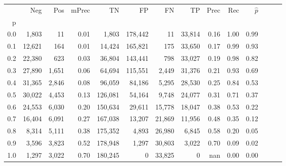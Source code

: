 \begin{tabular}{rrrrrrrrrrrrrr}
\toprule
{} &     Neg &    Pos & mPrec &       TN &       FP &      FN &      TP &  Prec &   Rec & $\hat{p}$ \\
p   &         &        &       &          &          &         &         &       &       &           \\
\midrule
0.0 &   1,803 &     11 &  0.01 &    1,803 &  178,442 &      11 &  33,814 &  0.16 &  1.00 &      0.99 \\
0.1 &  12,621 &    164 &  0.01 &   14,424 &  165,821 &     175 &  33,650 &  0.17 &  0.99 &      0.93 \\
0.2 &  22,380 &    623 &  0.03 &   36,804 &  143,441 &     798 &  33,027 &  0.19 &  0.98 &      0.82 \\
0.3 &  27,890 &  1,651 &  0.06 &   64,694 &  115,551 &   2,449 &  31,376 &  0.21 &  0.93 &      0.69 \\
0.4 &  31,365 &  2,846 &  0.08 &   96,059 &   84,186 &   5,295 &  28,530 &  0.25 &  0.84 &      0.53 \\
0.5 &  30,022 &  4,453 &  0.13 &  126,081 &   54,164 &   9,748 &  24,077 &  0.31 &  0.71 &      0.37 \\
0.6 &  24,553 &  6,030 &  0.20 &  150,634 &   29,611 &  15,778 &  18,047 &  0.38 &  0.53 &      0.22 \\
0.7 &  16,404 &  6,091 &  0.27 &  167,038 &   13,207 &  21,869 &  11,956 &  0.48 &  0.35 &      0.12 \\
0.8 &   8,314 &  5,111 &  0.38 &  175,352 &    4,893 &  26,980 &   6,845 &  0.58 &  0.20 &      0.05 \\
0.9 &   3,596 &  3,823 &  0.52 &  178,948 &    1,297 &  30,803 &   3,022 &  0.70 &  0.09 &      0.02 \\
1.0 &   1,297 &  3,022 &  0.70 &  180,245 &        0 &  33,825 &       0 &   nan &  0.00 &      0.00 \\
\bottomrule
\end{tabular}
